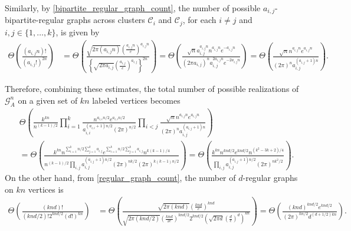 \documentclass[11pt,reqno]{amsart}
\theoremstyle{definition}
\theoremstyle{remark}
\theoremstyle{conjecture}
\begin{document}
Similarly, by \eqref{bipartite_regular_graph_count}, the number of possible $a_{i,j}$-bipartite-regular graphs across clusters $\mathcal{C}_{i}$ and $\mathcal{C}_{j}$, for each $i \neq j$ and $i, j \in \{1, \ldots, k\}$, is given by
\begin{align}%
\Theta\left(\frac{(a_{i,j} n)!}{(a_{i,j}!)^{2n}}\right) &= \Theta\left(\frac{\sqrt{2 \pi (a_{i,j} n)} \left(\frac{a_{i,j} n}{e}\right)^{a_{i,j} n}}{\left\{\sqrt{2 \pi a_{i,j}} \left(\frac{a_{i,j}}{e}\right)^{a_{i,j}}\right\}^{2n}}\right) = \Theta\left(\frac{\sqrt{n} a_{i,j}^{a_{i,j} n} n^{a_{i,j} n} e^{-a_{i,j} n}}{\left(2 \pi a_{i,j}\right)^{n} a_{i,j}^{2 a_{i,j} n} e^{-2 a_{i,j} n}}\right) = \Theta\left(\frac{\sqrt{n} n^{a_{i,j} n} e^{a_{i,j} n}}{(2 \pi)^{n} a_{i,j}^{(a_{i,j}+1)n}}\right). \nonumber
\end{align}

Therefore, combining these estimates, the total number of possible realizations of $\mathcal{G}^{n}_{A}$ on a given set of $k n$ labeled vertices becomes
\begin{align}\label{RSBM_model_count_estimate}
& \Theta\left(\frac{k^{kn}}{n^{(k-1)/2}} \prod_{i=1}^{k} \frac{n^{a_{i,i} n/2} e^{a_{i,i}n/2}}{a_{i,i}^{(a_{i,i}+1)n/2} (2\pi)^{n/2}} \prod_{i < j} \frac{\sqrt{n} n^{a_{i,j} n} e^{a_{i,j} n}}{(2 \pi)^{n} a_{i,j}^{(a_{i,j}+1)n}}\right) \nonumber\\
&= \Theta\left(\frac{k^{k n} n^{\sum_{i=1}^{k} n/2 \sum_{j=1}^{k} a_{i,j}} e^{\sum_{i=1}^{k} n/2 \sum_{j=1}^{k} a_{i,j}} n^{k(k-1)/4}}{n^{(k-1)/2} \prod_{i, j} a_{i,j}^{(a_{i,j}+1)n/2} (2\pi)^{nk/2} (2 \pi)^{k (k-1) n/2}}\right) = \Theta\left(\frac{k^{k n} n^{k n d/2} e^{k n d/2} n^{(k^{2} - 3k + 2)/4}}{\prod_{i, j} a_{i,j}^{(a_{i,j}+1)n/2} (2\pi)^{nk^{2}/2}}\right).
\end{align}
On the other hand, from \eqref{regular_graph_count}, the number of $d$-regular graphs on $kn$ vertices is 
\begin{align}\label{uniform_regular_count_estimate}
\Theta\left(\frac{(k n d)!}{(k n d/2)! 2^{k n d/2} (d!)^{k n}}\right) &= \Theta\left(\frac{\sqrt{2 \pi (k n d)} \left(\frac{k n d}{e}\right)^{k n d}}{\sqrt{2 \pi (k n d/2)} \left(\frac{k n d}{2 e}\right)^{k n d/2} 2^{k n d/2} \left(\sqrt{2 \pi d} \left(\frac{d}{e}\right)^{d}\right)^{k n}}\right) 
= \Theta\left(\frac{(k n d)^{k n d/2} e^{k n d/2}}{(2 \pi)^{k n/2} d^{(d+1/2)k n}}\right).
\end{align}
\end{document}
